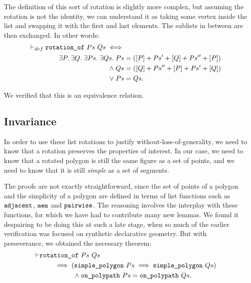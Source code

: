 The definition of this sort of rotation is slightly more complex, but assuming the rotation is not the identity, we can understand it as taking some vertex inside the list and swapping it with the first and last elements. The sublists in between are then exchanged. In other words:
\begin{align*}
    \vdash_{def}\;&\texttt{rotation\_of}\ Ps\ Qs \iff\\
    &\qquad\begin{aligned}
    \exists P.\;\exists Q.\;\exists Ps.\;\exists Qs.\; Ps &= ([P] + Ps' + [Q] + Ps'' + [P])\\
    \wedge\; Qs &= ([Q] + Ps'' + [P] + Ps' + [Q])\\
    \vee\; Ps &= Qs.
  \end{aligned}
\end{align*}

We verified that this is an equivalence relation.

\subsection{Invariance}
In order to use these list rotations to justify without-loss-of-generality, we need to know that a rotation preserves the properties of interest. In our case, we need to know that a rotated polygon is still the same figure as a set of points, and we need to know that it is still \emph{simple} as a set of segments. 

The proofs are not exactly straightforward, since the set of points of a polygon and the simplicity of a polygon are defined in terms of list functions such as $\texttt{adjacent}$, $\texttt{mem}$ and $\texttt{pairwise}$. The reasoning involves the interplay with these functions, for which we have had to contribute many new lemmas. We found it despairing to be doing this at such a late stage, when so much of the earlier verification was focused on synthetic declarative geometry. But with perseverance, we obtained the necessary theorem:
\begin{equation}\label{eq:PolygonRotateInvariant}
\begin{aligned}
\vdash      &\texttt{rotation\_of}\ Ps\ Qs\\
    &\qquad\implies (\texttt{simple\_polygon}\ Ps \implies \texttt{simple\_polygon}\ Qs)\\
    &\qquad\qquad\quad\wedge \texttt{on\_polypath}\ Ps = \texttt{on\_polypath}\ Qs.
  \end{aligned}
\end{equation}

